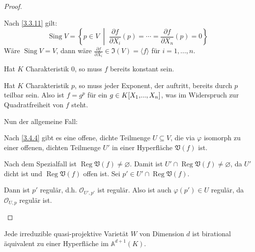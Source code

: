 \documentclass[a4paper,12pt,index=toc]{scrbook}
\theoremstyle{keinenummern} %
\def\A{\mathbb{A}}
\def\V{\mathfrak{V}}
\def\I{\mathfrak{I}}
\def\O{\mathcal{O}}
\newcommand{\Sing}{\operatorname{Sing}}
\newcommand{\Reg}{\operatorname{Reg}}
\renewcommand{\phi}{\varphi}
\newcommand{\leer}{\ensuremath{\varnothing}}
\renewcommand{\dotsc}{\ensuremath{\!...}}
\newcommand{\polyx}[1][n]{\ensuremath%
  [X_{1},\dotsc,X_{#1}]}
\begin{document}
\begin{proof}
\begin{enumerate}
Nach \cref{3.3.11} gilt:\begin{equation*}\Sing V=\left\{p\in V\;\middle|\; \frac{\partial f}{\partial X_i}(p)=\dotsm=\frac{\partial f}{\partial X_n}(p)=0\right\}\end{equation*}
Wäre $\Sing V=V$, dann wäre $\frac{\partial f}{\partial X_i}\in \I(V)=\langle f\rangle$ für $i=1,\dotsc,n$.

Hat $K$ Charakteristik $0$, so muss $f$ bereits konstant sein.

Hat $K$ Charakteristik $p$, so muss jeder Exponent, der auftritt, bereits durch $p$ teilbar sein. Also ist $f=g^p$ für ein $g\in K\polyx$, was im Widerspruch zur Quadratfreiheit von $f$ steht.

Nun der allgemeine Fall:

Nach \cref{3.4.4} gibt es eine offene, dichte Teilmenge $U\subseteq V$, die via $\varphi$ isomorph zu einer offenen, dichten Teilmenge $U'$ in einer Hyperfläche $\V(f)$ ist.

Nach dem Spezialfall ist $\Reg \V(f)\neq \leer$. Damit ist $U'\cap \Reg \V(f)\neq \leer$, da $U'$ dicht ist und $\Reg \V(f)$ offen ist. Sei $p'\in U'\cap \Reg \V(f)$.

Dann ist $p'$ regulär, d.h. $\O_{U',p'}$ ist regulär. Also ist auch $\phi(p') \in U$ regulär, da $\O_{U,p}$ regulär ist.
  \end{enumerate}
\end{proof}
\begin{lem}\label{3.4.4} Jede irreduzible quasi-projektive Varietät $W$ von Dimension $d$ ist birational äquivalent zu einer Hyperfläche im $\A^{d+1}(K)$.
\end{lem}
\end{document}

